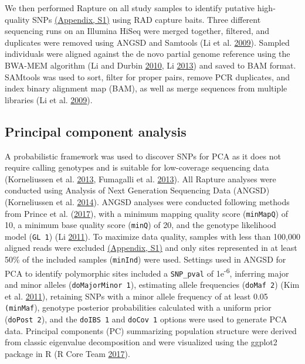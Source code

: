 \documentclass[proquest,12pt,final]{ucthesis-CA2012} %
\begin{document}
\begin{ucmainmatter}
We then performed Rapture on all study samples to identify putative
high-quality SNPs \protect\hyperlink{supptables}{(Appendix, S1)} using
RAD capture baits. Three different sequencing runs on an Illumina HiSeq
were merged together, filtered, and duplicates were removed using ANGSD
and Samtools (Li et al. \protect\hyperlink{ref-li_sequence_2009}{2009}).
Sampled individuals were aligned against the de novo partial genome
reference using the BWA-MEM algorithm (Li and Durbin
\protect\hyperlink{ref-li_fast_2010}{2010}, Li
\protect\hyperlink{ref-li_aligning_2013}{2013}) and saved to BAM format.
SAMtools was used to sort, filter for proper pairs, remove PCR
duplicates, and index binary alignment map (BAM), as well as merge
sequences from multiple libraries (Li et al.
\protect\hyperlink{ref-li_sequence_2009}{2009}).

\hypertarget{principal-component-analysis}{%
\subsection{Principal component
analysis}\label{principal-component-analysis}}

A probabilistic framework was used to discover SNPs for PCA as it does
not require calling genotypes and is suitable for low-coverage
sequencing data (Korneliussen et al.
\protect\hyperlink{ref-korneliussen_calculation_2013}{2013}, Fumagalli
et al. \protect\hyperlink{ref-fumagalli_quantifying_2013}{2013}). All
Rapture analyses were conducted using Analysis of Next Generation
Sequencing Data (ANGSD) (Korneliussen et al.
\protect\hyperlink{ref-korneliussen_angsd_2014}{2014}). ANGSD analyses
were conducted following methods from Prince et al.
(\protect\hyperlink{ref-prince_evolutionary_2017}{2017}), with a minimum
mapping quality score (\texttt{minMapQ}) of 10, a minimum base quality
score (\texttt{minQ}) of 20, and the genotype likelihood model
(\texttt{GL\ 1}) (Li \protect\hyperlink{ref-li_statistical_2011}{2011}).
To maximize data quality, samples with less than 100,000 aligned reads
were excluded \protect\hyperlink{supptables}{(Appendix, S1)} and only
sites represented in at least 50\% of the included samples
(\texttt{minInd}) were used. Settings used in ANGSD for PCA to identify
polymorphic sites included a \texttt{SNP\_pval} of
1e\textsuperscript{-6}, inferring major and minor alleles
(\texttt{doMajorMinor\ 1}), estimating allele frequencies
(\texttt{doMaf\ 2}) (Kim et al.
\protect\hyperlink{ref-kim_estimation_2011}{2011}), retaining SNPs with
a minor allele frequency of at least 0.05 \texttt{(minMaf}), genotype
posterior probabilities calculated with a uniform prior
(\texttt{doPost\ 2}), and the \texttt{doIBS\ 1} and \texttt{doCov\ 1}
options were used to generate PCA data. Principal components (PC)
summarizing population structure were derived from classic eigenvalue
decomposition and were visualized using the ggplot2 package in R (R Core
Team \protect\hyperlink{ref-r_core_team_r_2017}{2017}).


\end{ucmainmatter}
\end{document}
